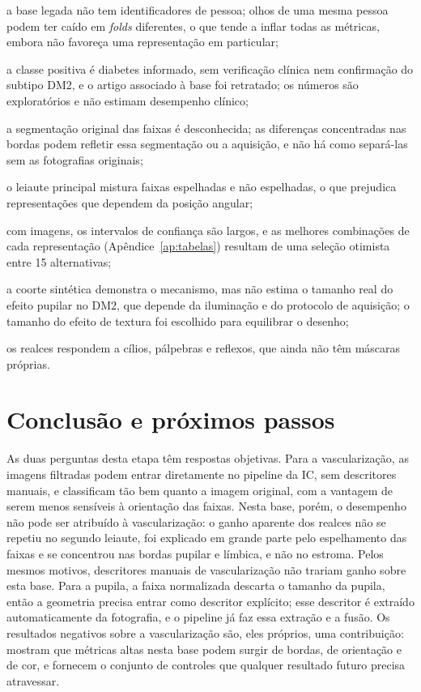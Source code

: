 \begin{alineas}
  \item a base legada não tem identificadores de pessoa; olhos de uma mesma
  pessoa podem ter caído em \emph{folds} diferentes, o que tende a inflar
  todas as métricas, embora não favoreça uma representação em particular;
  \item a classe positiva é diabetes informado, sem verificação clínica nem
  confirmação do subtipo DM2, e o artigo associado à base foi retratado; os
  números são exploratórios e não estimam desempenho clínico;
  \item a segmentação original das faixas é desconhecida; as diferenças
  concentradas nas bordas podem refletir essa segmentação ou a aquisição, e
  não há como separá-las sem as fotografias originais;
  \item o leiaute principal mistura faixas espelhadas e não espelhadas, o que
  prejudica representações que dependem da posição angular;
  \item com  imagens, os intervalos de confiança são largos, e
  as melhores combinações de cada representação (Apêndice~\ref{ap:tabelas})
  resultam de uma seleção otimista entre 15 alternativas;
  \item a coorte sintética demonstra o mecanismo, mas não estima o tamanho
  real do efeito pupilar no DM2, que depende da iluminação e do protocolo de
  aquisição; o tamanho do efeito de textura foi escolhido para equilibrar o
  desenho;
  \item os realces respondem a cílios, pálpebras e reflexos, que ainda não
  têm máscaras próprias.
\end{alineas}

\chapter{Conclusão e próximos passos}
\label{cap:conclusao}

As duas perguntas desta etapa têm respostas objetivas. Para a
vascularização, as imagens filtradas podem entrar diretamente no pipeline da
IC, sem descritores manuais, e classificam tão bem quanto a imagem original,
com a vantagem de serem menos sensíveis à orientação das faixas. Nesta base,
porém, o desempenho não pode ser atribuído à vascularização: o ganho aparente
dos realces não se repetiu no segundo leiaute, foi explicado em grande parte
pelo espelhamento das faixas e se concentrou nas bordas pupilar e límbica, e
não no estroma. Pelos mesmos motivos, descritores manuais de vascularização
não trariam ganho sobre esta base. Para a pupila, a faixa normalizada descarta
o tamanho da pupila, então a geometria precisa entrar como descritor
explícito; esse descritor é extraído automaticamente da fotografia, e o
pipeline já faz essa extração e a fusão. Os resultados negativos sobre a
vascularização são, eles próprios, uma contribuição: mostram que métricas
altas nesta base podem surgir de bordas, de orientação e de cor, e fornecem o
conjunto de controles que qualquer resultado futuro precisa atravessar.

